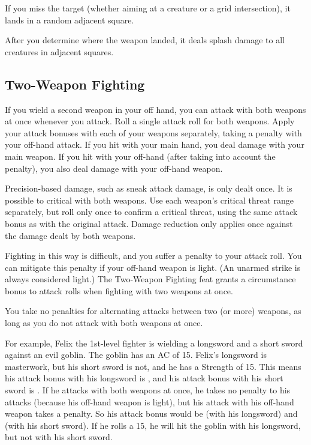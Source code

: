 If you miss the target (whether aiming at a creature or a grid intersection), it lands in a random adjacent square.

After you determine where the weapon landed, it deals splash damage to all creatures in adjacent squares.

\subsection{Two-Weapon Fighting}
If you wield a second weapon in your off hand, you can attack with both weapons at once whenever you attack. Roll a single attack roll for both weapons. Apply your attack bonuses with each of your weapons separately, taking a  penalty with your off-hand attack. If you hit with your main hand, you deal damage with your main weapon. If you hit with your off-hand (after taking into account the  penalty), you also deal damage with your off-hand weapon.

\par Precision-based damage, such as sneak attack damage, is only dealt once. It is possible to critical with both weapons. Use each weapon's critical threat range separately, but roll only once to confirm a critical threat, using the same attack bonus as with the original attack. Damage reduction only applies once against the damage dealt by both weapons.

\par Fighting in this way is difficult, and you suffer a  penalty to your attack roll. You can mitigate this penalty if your off-hand weapon is light. (An unarmed strike is always considered light.) The Two-Weapon Fighting feat grants a  circumstance bonus to attack rolls when fighting with two weapons at once.

You take no penalties for alternating attacks between two (or more) weapons, as long as you do not attack with both weapons at once.

\par For example, Felix the 1st-level fighter is wielding a longsword and a short sword against an evil goblin. The goblin has an AC of 15. Felix's longsword is masterwork, but his short sword is not, and he has a Strength of 15. This means his attack bonus with his longsword is , and his attack bonus with his short sword is . If he attacks with both weapons at once, he takes no penalty to his attacks (because his off-hand weapon is light), but his attack with his off-hand weapon takes a  penalty. So his attack bonus would be  (with his longsword) and  (with his short sword). If he rolls a 15, he will hit the goblin with his longsword, but not with his short sword.

